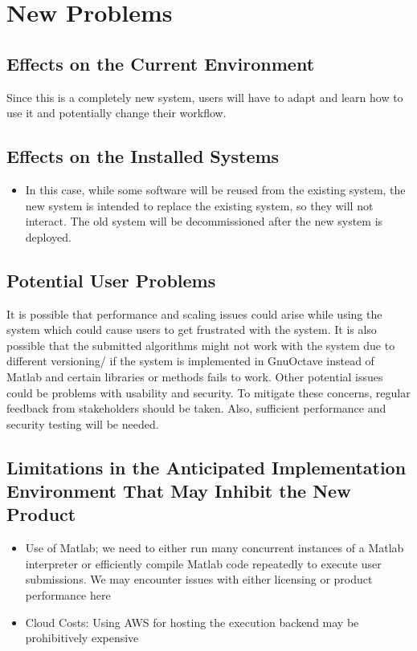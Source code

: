 \documentclass[12pt]{article}
\begin{document}
\section{New Problems}
\subsection{Effects on the Current Environment}
Since this is a completely new system, users will have to adapt and learn how to use it and potentially change their workflow. 
\subsection{Effects on the Installed Systems}
\begin{itemize}
    \item In this case, while some software will be reused from the existing system, the new system is intended to replace the existing system, so they will not interact. The old system will be decommissioned after the new system is deployed.
\end{itemize}

\subsection{Potential User Problems}
It is possible that performance and scaling issues could arise while using the system which could cause users to get frustrated with the system. It is also possible that the submitted algorithms might not work with the system due to different versioning/ if the system is implemented in GnuOctave instead of Matlab and certain libraries or methods fails to work. Other potential issues could be problems with usability and security. To mitigate these concerns, regular feedback from stakeholders should be taken. Also, sufficient performance and security testing will be needed.

\subsection{Limitations in the Anticipated Implementation Environment That May
Inhibit the New Product}
\begin{itemize}
    \item Use of Matlab; we need to either run many concurrent instances of a Matlab interpreter or efficiently compile Matlab code repeatedly to execute user submissions. We may encounter issues with either licensing or product performance here
    \item Cloud Costs: Using AWS for hosting the execution backend may be prohibitively expensive
\end{itemize}
\end{document}
